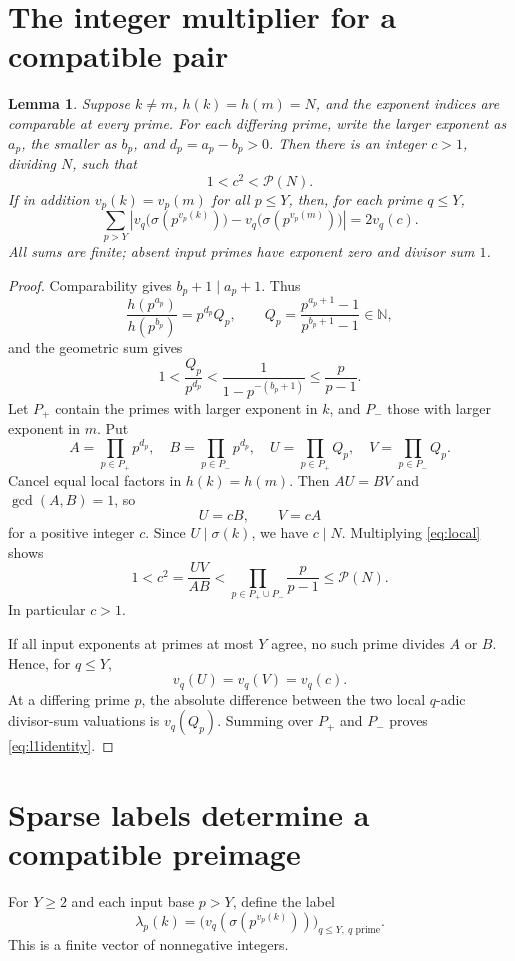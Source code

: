 \documentclass[11pt]{article}
\newtheorem{lemma}[theorem]{Lemma}
\newcommand{\NN}{\mathbb N}
\newcommand{\PP}{\mathcal P}
\begin{document}
\section{The integer multiplier for a compatible pair}
\begin{lemma}\label{lem:multiplier}
Suppose $k\ne m$, $h(k)=h(m)=N$, and the exponent indices are comparable at every prime. For each differing prime, write the larger exponent as $a_p$, the smaller as $b_p$, and $d_p=a_p-b_p>0$. Then there is an integer $c>1$, dividing $N$, such that
\[
 1<c^2<\PP(N).
\]
If in addition $v_p(k)=v_p(m)$ for all $p\le Y$, then, for each prime $q\le Y$,
\begin{equation}\label{eq:l1identity}
 \sum_{p>Y}\left|v_q\bigl(\sigma(p^{v_p(k)})\bigr)
                   -v_q\bigl(\sigma(p^{v_p(m)})\bigr)\right|
 =2v_q(c).
\end{equation}
All sums are finite; absent input primes have exponent zero and divisor sum $1$.
\end{lemma}
\begin{proof}
Comparability gives $b_p+1\mid a_p+1$. Thus
\[
 \frac{h(p^{a_p})}{h(p^{b_p})}=p^{d_p}Q_p,
 \qquad Q_p=\frac{p^{a_p+1}-1}{p^{b_p+1}-1}\in\NN,
\]
and the geometric sum gives
\begin{equation}\label{eq:local}
 1<\frac{Q_p}{p^{d_p}}<\frac1{1-p^{-(b_p+1)}}\le\frac p{p-1}.
\end{equation}
Let $P_+$ contain the primes with larger exponent in $k$, and $P_-$ those with larger exponent in $m$. Put
\[
 A=\prod_{p\in P_+}p^{d_p},\quad B=\prod_{p\in P_-}p^{d_p},\quad
 U=\prod_{p\in P_+}Q_p,\quad V=\prod_{p\in P_-}Q_p.
\]
Cancel equal local factors in $h(k)=h(m)$. Then $AU=BV$ and $\gcd(A,B)=1$, so
\[
 U=cB,\qquad V=cA
\]
for a positive integer $c$. Since $U\mid\sigma(k)$, we have $c\mid N$. Multiplying \eqref{eq:local} shows
\[
 1<c^2=\frac{UV}{AB}
 <\prod_{p\in P_+\cup P_-}\frac p{p-1}\le\PP(N).
\]
In particular $c>1$.

If all input exponents at primes at most $Y$ agree, no such prime divides $A$ or $B$. Hence, for $q\le Y$,
\[
 v_q(U)=v_q(V)=v_q(c).
\]
At a differing prime $p$, the absolute difference between the two local $q$-adic divisor-sum valuations is $v_q(Q_p)$. Summing over $P_+$ and $P_-$ proves \eqref{eq:l1identity}.
\end{proof}

\section{Sparse labels determine a compatible preimage}
For $Y\ge2$ and each input base $p>Y$, define the label
\[
 \lambda_p(k)=\bigl(v_q(\sigma(p^{v_p(k)}))\bigr)_{q\le Y,\ q\text{ prime}}.
\]
This is a finite vector of nonnegative integers.
\end{document}
